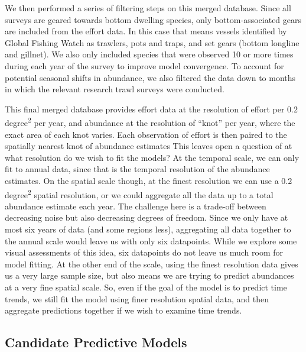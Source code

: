 \documentclass[twoside,12pt,final]{ucthesis-CA2012}
\begin{document}
\begin{ucmainmatter}
We then performed a series of filtering steps on this merged database.
Since all surveys are geared towards bottom dwelling species, only
bottom-associated gears are included from the effort data. In this case
that means vessels identified by Global Fishing Watch as trawlers, pots
and traps, and set gears (bottom longline and gillnet). We also only
included species that were observed 10 or more times during each year of
the survey to improve model convergence. To account for potential
seasonal shifts in abundance, we also filtered the data down to months
in which the relevant research trawl surveys were conducted.

This final merged database provides effort data at the resolution of
effort per 0.2 degree\textsuperscript{2} per year, and abundance at the
resolution of ``knot'' per year, where the exact area of each knot
varies. Each observation of effort is then paired to the spatially
nearest knot of abundance estimates This leaves open a question of at
what resolution do we wish to fit the models? At the temporal scale, we
can only fit to annual data, since that is the temporal resolution of
the abundance estimates. On the spatial scale though, at the finest
resolution we can use a 0.2 degree\textsuperscript{2} spatial
resolution, or we could aggregate all the data up to a total abundance
estimate each year. The challenge here is a trade-off between decreasing
noise but also decreasing degrees of freedom. Since we only have at most
six years of data (and some regions less), aggregating all data together
to the annual scale would leave us with only six datapoints. While we
explore some visual assessments of this idea, six datapoints do not
leave us much room for model fitting. At the other end of the scale,
using the finest resolution data gives us a very large sample size, but
also means we are trying to predict abundances at a very fine spatial
scale. So, even if the goal of the model is to predict time trends, we
still fit the model using finer resolution spatial data, and then
aggregate predictions together if we wish to examine time trends.

\subsection{Candidate Predictive
Models}\label{candidate-predictive-models}


\end{ucmainmatter}
\end{document}
